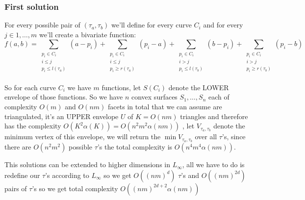 \documentclass{article}
\theoremstyle{remark}
\theoremstyle{definition}
\begin{document}
\subsubsection{First solution}
For every possible pair of $(\tau_a, \tau_b)$ we'll define for every curve $C_i$ and for every $j\in1,\ldots,m$ we'll create a bivariate function:
$$f(a, b) = \displaystyle\sum\limits_{\substack{p_i \in C_i\\ i\leq j \\ p_i \leq l(\tau_a)}}{(a - p_i)} +   
\displaystyle\sum\limits_{\substack{p_i \in C_i\\ i\leq j \\ p_i \geq r(\tau_a)}}{(p_i - a)} +   
\displaystyle\sum\limits_{\substack{p_i \in C_i\\ i>j     \\ p_i \leq l(\tau_b)}}{(b - p_i)} +   
\displaystyle\sum\limits_{\substack{p_i \in C_i\\ i>j     \\ p_i \geq r(\tau_b)}}{(p_i - b)}$$

\paragraph{}
\label{firstsolotion}
So for each curve $C_i$ we have $m$ functions, let $S(C_i)$ denote the LOWER envelope of those functions. So we have $n$ convex surfaces $S_1, \ldots, S_n$ each of complexity $O(m)$ and $O(n m)$ facets in total that we can assume are triangulated, it's an UPPER envelope $U$ of $K=O(n m)$ triangles and therefore has the complexity $O(K^2\alpha(K))=O(n^2 m^2\alpha(n m))$ \cite{DBLP:journals/dcg/EdelsbrunnerGS89} \cite{DBLP:journals/dcg/PachS89}, let $V_{\tau_a, \tau_b}$ denote the minimum vertex of this envelope, we will return the $\min V_{\tau_a, \tau_b}$ over all $\tau$'s, since there are $O(n^2 m^2)$
possible $\tau$'s the total complexity is $O(n^4 m^4\alpha(n m))$.

This solutions can be extended to higher dimensions in $L_\infty$, all we have to do is redefine our $\tau$'s according to $L_\infty$ so we get $O((n m)^d)$ $\tau$'s and $O((n m)^{2d})$ pairs of $\tau$'s so we get total complexity $O((n m)^{2d + 2}\alpha(n m))$
\paragraph{}
\end{document}
